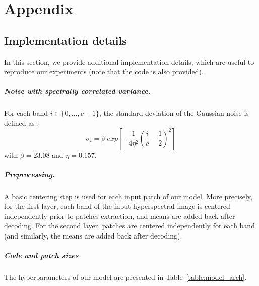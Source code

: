 \chapter*{Appendix}

\section{Implementation details}

In this section, we provide additional implementation details, which are useful to reproduce our experiments (note that the code is also provided).

\paragraph{Noise with spectrally correlated variance.}
For each band $i \in \{ 0, \ldots, c -1 \}$, the standard deviation of the Gaussian noise is defined as :
$$
\sigma_i = \beta \ exp \left[ - \frac{1}{4 \eta^2} \left(\frac{i}{c} - \frac{1}{2}\right)^2  \right]
$$
with $\beta=23.08$ and $\eta=0.157$.

\paragraph{Preprocessing.}
A basic centering step is used for each input patch of our model.
More precisely, for the first layer, each band of the input hyperspectral image is
centered independently prior to patches extraction, and means are added
back after decoding.
For the second layer, patches are centered independently for each band (and similarly, the means are added back after decoding).

\paragraph{Code and patch sizes}
The hyperparameters of our model are presented in Table~\ref{table:model_arch}.

\begin{table}[H]
	\centering
	\label{table:model_arch}
\end{table}

